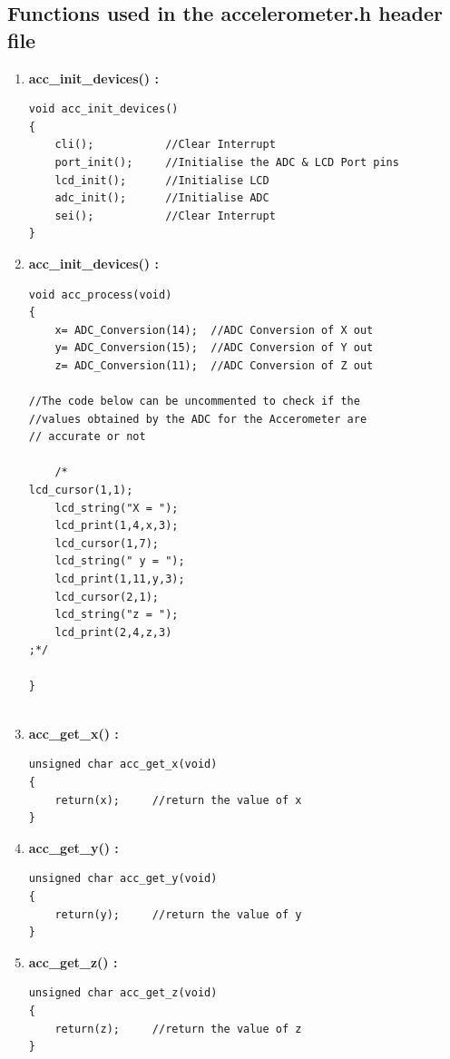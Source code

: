 \documentclass[a4paper,12 pt]{article}
\begin{document}
\subsection{Functions used in the accelerometer.h header file}
\begin{enumerate}
\item \textbf{acc\_init\_devices() :}\\
\vspace{-5mm}
\begin{verbatim}
void acc_init_devices()
{
	cli();           //Clear Interrupt
	port_init();     //Initialise the ADC & LCD Port pins
	lcd_init();      //Initialise LCD 
	adc_init();      //Initialise ADC
	sei();           //Clear Interrupt
}

\end{verbatim}

\item \textbf{acc\_init\_devices() :}\\
\vspace{-5mm}
\begin{verbatim}
void acc_process(void)
{
	x= ADC_Conversion(14);  //ADC Conversion of X out
	y= ADC_Conversion(15);  //ADC Conversion of Y out
	z= ADC_Conversion(11);  //ADC Conversion of Z out

//The code below can be uncommented to check if the
//values obtained by the ADC for the Accerometer are
// accurate or not

	/*
lcd_cursor(1,1);
	lcd_string("X = ");
	lcd_print(1,4,x,3);
	lcd_cursor(1,7);
	lcd_string(" y = ");
	lcd_print(1,11,y,3);
	lcd_cursor(2,1);
	lcd_string("z = ");
	lcd_print(2,4,z,3)
;*/

}


\end{verbatim}

\item \textbf{acc\_get\_x() :}\\
\vspace{-5mm}
\begin{verbatim}
unsigned char acc_get_x(void)
{
	return(x);     //return the value of x
}

\end{verbatim}

\item \textbf{acc\_get\_y() :}\\
\vspace{-5mm}
\begin{verbatim}
unsigned char acc_get_y(void)
{
	return(y);     //return the value of y
}

\end{verbatim}


\item \textbf{acc\_get\_z() :}\\
\vspace{-5mm}
\begin{verbatim}
unsigned char acc_get_z(void)
{
	return(z);     //return the value of z
}

\end{verbatim}

\end{enumerate}
\end{document}
